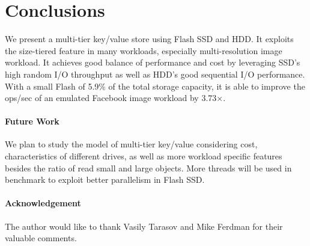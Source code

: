 \section{Conclusions}
\label{sec:conc}
We present a multi-tier key/value store using Flash SSD and HDD. It
exploits the size-tiered feature in many workloads, especially
multi-resolution image workload. It achieves good balance of
performance and cost by leveraging SSD's high random I/O throughput as
well as HDD's good sequential I/O performance. With a small Flash of
5.9\% of the total storage capacity, it is able to improve the ops/sec
of an emulated Facebook image workload by 3.73$\times$.

\paragraph{Future Work}
We plan to study the model of multi-tier key/value considering cost,
characteristics of different drives, as well as more workload specific
features besides the ratio of read small and large objects. More
threads will be used in benchmark to exploit better parallelism in
Flash SSD.

\paragraph{Acknowledgement}
The author would like to thank Vasily Tarasov and Mike Ferdman for
their valuable comments.

